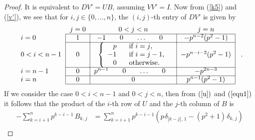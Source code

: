 \documentclass[a4paper,11pt]{amsart}
\begin{document}
\begin{proof}
 It is equivalent to $DV'=UB$, assuming  $VV'=I$. Now  from (\ref{k5}) and (\ref{v'}),  we see that for $i,j\in\{0,\hdots,n\}$, the $(i,j)$-th entry of $DV'$ is given by
\begin{equation}\begin{tabular}{ l|c|c|c| }
\multicolumn{1}{r}{}
 & \multicolumn{1}{c}{$j=0$}
 &  \multicolumn{1}{c}{$0<j<n$}
 & \multicolumn{1}{c}{$j=n$}\\
\cline{2-4}
$i=0$&1 &$\begin{matrix}-1\quad&0\quad&\hdots\quad&0\quad\end{matrix}$&$-p^{n-2}(p^2-1)$\\
\cline{2-4}
$0<i<n-1$ & 0& $\left\{\begin{array}{cl}
p&\text{if  $i=j$,}\\
-1\hspace{8pt}&\text{if  $i=j-1$,}\\
0&\text{otherwise.}    
      \end{array}\right.$&$-p^{n-i-2}(p^2-1)$\\
\cline{2-4}
$i=n-1$ & 0 & $\begin{matrix}p^{n-1}\quad&0\quad&\hdots\quad&0\quad\end{matrix}$&$-p^{2n-3}$\\
\cline{2-4}
$i=n$ &0 & $0$&$p^{n-1}(p^2-1$)\\
\cline{2-4}
\end{tabular}\hspace{8pt}.\end{equation}
If we consider the case $0<i<n-1$ and $0<j<n$, then from
$(\ref{u})$ and $(\ref{equ1})$ it follows that the product of the $i$-th row of $U$
and the $j$-th column of $B$ is \begin{align*}-\sum_{k=i+1}^np^{k-i-1}\hspace{2pt}B_{k,\hspace{1pt}j}&=\sum_{k=i+1}^np^{k-i-1}(p\hspace{1pt}\delta_{|k-j|\hspace{1pt},\hspace{1pt}1}-(p^2+1)\hspace{1pt}\delta_{k,\hspace{1pt}j})\\

\end{align*}
\end{proof}
\end{document}
